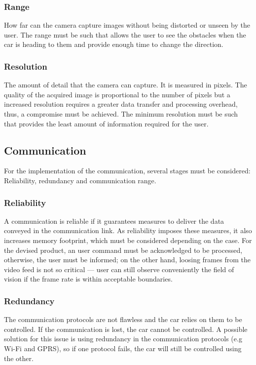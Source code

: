 \subsubsection{Range}%
\label{sec:orgecb044c}
How far can the camera capture images without being distorted or unseen by the user. The range must be such that allows the user to see the obstacles when the car is heading to them and provide enough time to change the direction.
\subsubsection{Resolution}%
\label{sec:orgba87554}%
The amount of detail that the camera can capture. It is measured in pixels. The quality of the acquired image is proportional to the number of pixels but a increased resolution requires a greater data transfer and processing overhead, thus, a compromise must be achieved. The minimum resolution must be such that provides the least amount of information required for the user. 
\subsection{Communication}%
\label{sec:org4241610}
For the implementation of the communication, several stages must be considered: Reliability, redundancy and communication range.
\subsubsection{Reliability}%
\label{sec:orgdcb920d}	
A communication is reliable if it guarantees measures to deliver the data
conveyed in the communication link. As reliability imposes these measures, it
also increases memory footprint, which must be considered
depending on the case. For the devised product, an user command
must be acknowledged to be processed, otherwise, the user must be informed; on
the other hand, loosing frames from the video feed is not so critical — user can
still observe conveniently the ﬁeld of vision if the frame rate is within
acceptable boundaries.
\subsubsection{Redundancy}%
\label{sec:orgc5933fc}
The communication protocols are not flawless and the car relies on them to be controlled. If the communication is lost, the car cannot be controlled. A possible solution for this issue is using redundancy in the communication protocols (e.g Wi-Fi and GPRS), so if one protocol fails, the car will still be controlled using the other.
